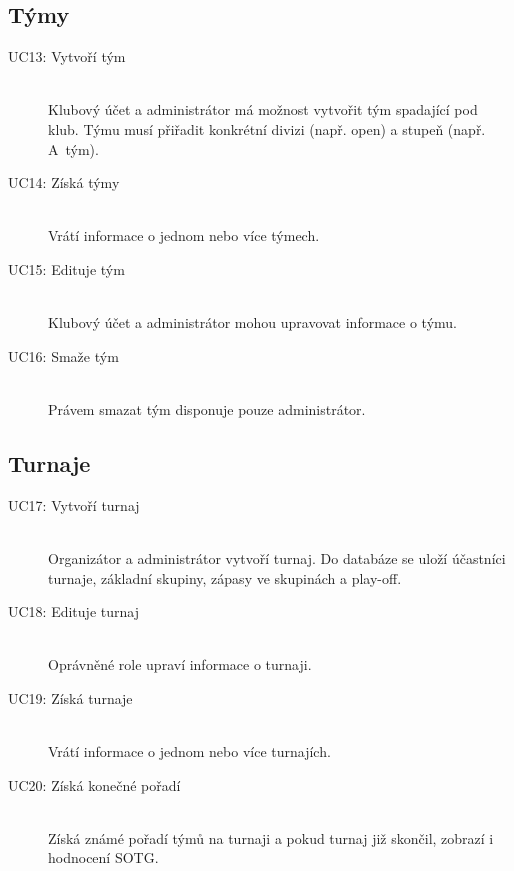 \subsection*{Týmy}
  \begin{description}
    \item[UC13: Vytvoří tým] \hfill \\
    Klubový účet a administrátor má možnost vytvořit tým spadající pod klub. Týmu musí přiřadit
    konkrétní divizi (např. open) a stupeň (např. A~tým).
    \item[UC14: Získá týmy] \hfill \\
    Vrátí informace o jednom nebo více týmech.
    \item[UC15: Edituje tým] \hfill \\
    Klubový účet a administrátor mohou upravovat informace o týmu. 
    \item[UC16: Smaže tým] \hfill \\
    Právem smazat tým disponuje pouze administrátor.
  \end{description}

\subsection*{Turnaje}
  \begin{description}
    \item[UC17: Vytvoří turnaj] \hfill \\
    Organizátor a administrátor vytvoří turnaj. Do databáze se uloží účastníci turnaje,
    základní skupiny, zápasy ve skupinách a play-off.
    \item[UC18: Edituje turnaj] \hfill \\
    Oprávněné role upraví informace o turnaji.
    \item[UC19: Získá turnaje] \hfill \\
    Vrátí informace o jednom nebo více turnajích.
    \item[UC20: Získá konečné pořadí] \hfill \\
    Získá známé pořadí týmů na turnaji a pokud turnaj již skončil, zobrazí i hodnocení SOTG.
  \end{description}

